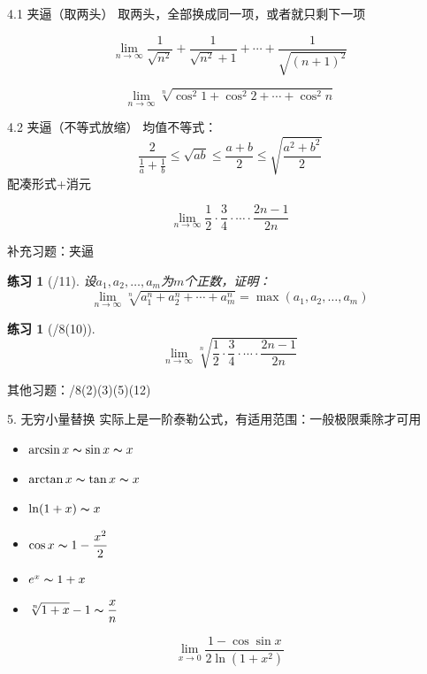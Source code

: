 \documentclass[UTF8]{ctexbeamer}
\newtheorem{exercise}[theorem]{练习} %
\begin{document}
\begin{frame}{4.1 夹逼（取两头）}
取两头，全部换成同一项，或者就只剩下一项
\begin{example}[17复旦高数]
\[\lim_{n\to\infty}\frac{1}{\sqrt{n^2}}+\frac{1}{\sqrt{n^2}+1}+\cdots+\frac{1}{\sqrt{(n+1)^2}}\]
\end{example}
\begin{example}[17数分期中]
\[\lim_{n\to\infty}\sqrt[n]{\cos^2 1+\cos^2 2+\cdots+\cos^2 n}\]
\end{example}
\end{frame}

\begin{frame}{4.2 夹逼（不等式放缩）}
均值不等式：
\[\frac{2}{\frac{1}{a}+\frac{1}{b}}\leq\sqrt{ab}\leq\frac{a+b}{2}\leq\sqrt{\frac{a^2+b^2}{2}}\]
配凑形式+消元
\begin{example}[\textsection 3.2/8(9)]
\[\lim_{n\to\infty}\frac{1}{2}\cdot\frac{3}{4}\cdot\cdots\cdot\frac{2n-1}{2n}\]
\end{example}
\end{frame}

\begin{frame}{补充习题：夹逼}
\begin{exercise}[/11]
设$a_1,a_2,\ldots,a_m$为$m$个正数，证明：
\[\lim_{n\to\infty}\sqrt[n]{a_1^n+a_2^n+\cdots+a_m^n}=\max(a_1,a_2,\ldots,a_m)\]
\end{exercise}
\begin{exercise}[/8(10)]
\[\lim_{n\to\infty}\sqrt[n]{\frac{1}{2}\cdot\frac{3}{4}\cdot\cdots\cdot\frac{2n-1}{2n}}\]
\end{exercise}
其他习题：/8(2)(3)(5)(12)
\end{frame}

\begin{frame}{5. 无穷小量替换}
实际上是一阶泰勒公式，有适用范围：一般极限乘除才可用
\begin{itemize}
	\item $\arcsin x\thicksim\sin x\thicksim x$
	\item $\arctan x\thicksim\tan x\thicksim x$
	\item $\ln(1+x)\thicksim x$
	\item $\displaystyle \cos x\thicksim 1-\frac{x^2}{2}$
	\item $e^x\thicksim 1+x$
	\item $\displaystyle \sqrt[n]{1+x}-1\thicksim\frac{x}{n}$
\end{itemize}
\begin{example}
\[\lim_{x\to 0}\frac{1-\cos\sin x}{2\ln(1+x^2)}\] %
\end{example}
\end{frame}
\end{document}
